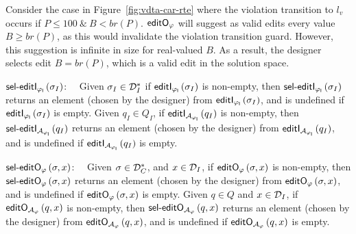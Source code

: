 \begin{example}
Consider the case in Figure~\ref{fig:vdta-car-rte} where the violation transition to $l_v$ occurs if $P \leq 100~\&~B < br\left(P\right)$.
$\mathsf{editO_{\varphi}}$ will suggest as valid edits every value $B \geq br\left(P\right)$, as this would invalidate the violation transition guard.
However, this suggestion is infinite in size for real-valued $B$.
As a result, the designer selects edit $B = br\left(P\right)$, which is a valid edit in the solution space.
\end{example}

\item
{\boldmath$\mathsf{{sel}\mbox{-} editI_{\varphi_{I}}}\left(\sigma_I\right)$:}~~ Given $\sigma_I\in {\mathcal D}_I^*$ if $\mathsf{editI_{\varphi_I}}\left(\sigma_I\right)$ is non-empty, then $\mathsf{{sel}\mbox{-} editI_{\varphi_{I}}}\left(\sigma_I\right)$ returns an element (chosen by the designer) from $\mathsf{editI_{\varphi_I}}\left(\sigma_I\right)$, and is undefined if $\mathsf{editI_{\varphi_I}}\left(\sigma_I\right)$ is empty.
Given $q_I\in Q_I$, if $\mathsf{editI_{{\mathcal A}_{\varphi_I}}}\left(q_I\right)$ is non-empty, then $\mathsf{{sel}\mbox{-} editI_{{\mathcal A}_{\varphi_{I}}}}\left(q_I\right)$ returns an element (chosen by the designer) from $\mathsf{editI_{{\mathcal A}_{\varphi_I}}}\left(q_I\right)$, and is undefined if $\mathsf{editI_{{\mathcal A}_{\varphi_I}}}\left(q_I\right)$ is empty.
\item {\boldmath$\mathsf{{sel}\mbox{-} editO_{\varphi}}\left(\sigma,x\right)$:}~~ Given $\sigma\in {\mathcal D}_{C}^*$, and $x\in {\mathcal D}_I$,  if $\mathsf{editO_{\varphi}}\left(\sigma,x\right)$ is non-empty, then $\mathsf{{sel}\mbox{-} editO_{\varphi}}\left(\sigma,x\right)$ returns an element (chosen by the designer) from $\mathsf{editO_{\varphi}}\left(\sigma,x\right)$, and is undefined if $\mathsf{editO_{\varphi}}\left(\sigma,x\right)$ is empty.
%
Given $q\in Q$ and $x \in {\mathcal D}_I$, if $\mathsf{editO_{{\mathcal A}_\varphi}}\left(q,x\right)$ is non-empty, then $\mathsf{{sel}\mbox{-} editO_{{\mathcal A}_\varphi}}\left(q,x\right)$ returns an element (chosen by the designer) from $\mathsf{editO_{{\mathcal A}_\varphi}}\left(q,x\right)$, and is undefined if $\mathsf{editO_{{\mathcal A}_\varphi}}\left(q,x\right)$ is empty.
%


